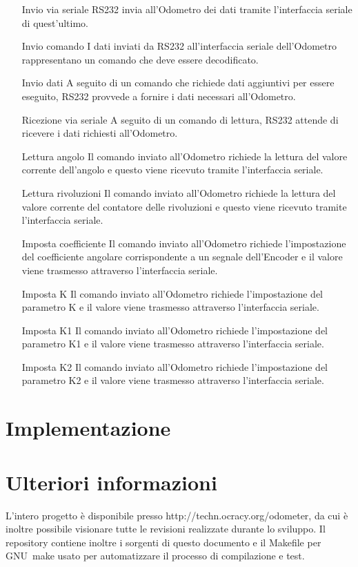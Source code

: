 \documentclass [11pt,a4paper,oneside]{article}
\newcommand{\href}[2]{#2}
\newcommand{\link}[1]{\href{#1}{#1}}
\begin{document}
\begin{itemize}
\item[Invio via seriale] RS232 invia all'Odometro dei dati tramite l'interfaccia
     seriale di quest'ultimo.
\item[Invio comando] I dati inviati da RS232 all'interfaccia seriale dell'Odometro
     rappresentano un comando che deve essere decodificato.
\item[Invio dati] A seguito di un comando che richiede dati aggiuntivi per essere
     eseguito, RS232 provvede a fornire i dati necessari all'Odometro.
\item[Ricezione via seriale] A seguito di un comando di lettura, RS232 attende di
     ricevere i dati richiesti all'Odometro.
\item[Lettura angolo] Il comando inviato all'Odometro richiede la lettura del
     valore corrente dell'angolo e questo viene ricevuto tramite l'interfaccia
     seriale.
\item[Lettura rivoluzioni] Il comando inviato all'Odometro richiede la lettura del
     valore corrente del contatore delle rivoluzioni e questo viene ricevuto
     tramite l'interfaccia seriale.
\item[Imposta coefficiente] Il comando inviato all'Odometro richiede l'impostazione
     del coefficiente angolare corrispondente a un segnale dell'Encoder e il valore
     viene trasmesso attraverso l'interfaccia seriale.
\item[Imposta K] Il comando inviato all'Odometro richiede l'impostazione del
     parametro K e il valore viene trasmesso attraverso l'interfaccia seriale.
\item[Imposta K1] Il comando inviato all'Odometro richiede l'impostazione del
     parametro K1 e il valore viene trasmesso attraverso l'interfaccia seriale.
\item[Imposta K2] Il comando inviato all'Odometro richiede l'impostazione del
     parametro K2 e il valore viene trasmesso attraverso l'interfaccia seriale.
\end{itemize}


\section{Implementazione}


\section{Ulteriori informazioni}
L'intero progetto è disponibile presso \link{http://techn.ocracy.org/odometer}, da cui
è inoltre possibile visionare tutte le revisioni realizzate durante lo sviluppo.
Il repository contiene inoltre i sorgenti di questo documento e il Makefile
per GNU~make usato per automatizzare il processo di compilazione e test.
\end{document}
